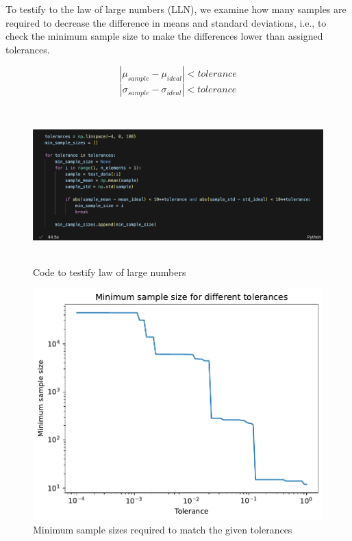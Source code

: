 \documentclass[12pt,a4paper]{article}
\begin{document}
\begin{CJK}{UTF8}{bkai}
To testify to the law of large numbers (LLN), we examine how many samples are required to decrease the difference in means and standard deviations, i.e., to check the minimum sample size to make the differences lower than assigned tolerances. 

\begin{equation}
    |\mu_{sample}-\mu_{ideal}|<tolerance
\end{equation}
\begin{equation}
    |\sigma_{sample}-\sigma_{ideal}|<tolerance
\end{equation}
\begin{figure}[h]
    \centering
    \includegraphics[height=6cm]{figures/code/code_1_6.png}
    \caption{Code to testify law of large numbers}
    \label{fig:code_1_6}
\end{figure}

\clearpage

\begin{figure}[h]
    \centering
    \includegraphics[width=0.7\linewidth]{figures/practice_1_1_tolerance.pdf}
    \caption{Minimum sample sizes required to match the given tolerances}
    \label{fig:practice_1_1_tolerance}
\end{figure}


\end{CJK}
\end{document}
